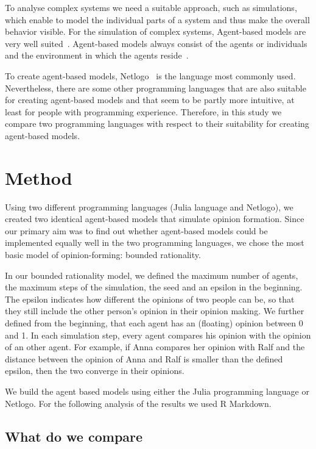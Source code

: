 \documentclass[runningheads]{llncs}
\begin{document}
To analyse complex systems we need a suitable approach, such as
simulations, which enable to model the individual parts of a system and
thus make the overall behavior visible. For the simulation of complex
systems, Agent-based models are very well suited~\autocite{Epstein2007}.
Agent-based models always consist of the agents or individuals and the
environment in which the agents
reside~\autocite{Bonabeau2002Agentbased}.

To create agent-based models, Netlogo~\autocite{Wilensky1999} is the
language most commonly used. Nevertheless, there are some other
programming languages that are also suitable for creating agent-based
models and that seem to be partly more intuitive, at least for people
with programming experience. Therefore, in this study we compare two
programming languages with respect to their suitability for creating
agent-based models.

\hypertarget{method}{%
\section{Method}\label{method}}

Using two different programming languages (Julia language and Netlogo),
we created two identical agent-based models that simulate opinion
formation. Since our primary aim was to find out whether agent-based
models could be implemented equally well in the two programming
languages, we chose the most basic model of opinion-forming: bounded
rationality.

In our bounded rationality model, we defined the maximum number of
agents, the maximum steps of the simulation, the seed and an epsilon in
the beginning. The epsilon indicates how different the opinions of two
people can be, so that they still include the other person's opinion in
their opinion making. We further defined from the beginning, that each
agent has an (floating) opinion between 0 and 1. In each simulation
step, every agent compares his opinion with the opinion of an other
agent. For example, if Anna compares her opinion with Ralf and the
distance between the opinion of Anna and Ralf is smaller than the
defined epsilon, then the two converge in their opinions.

We build the agent based models using either the Julia programming
language or Netlogo. For the following analysis of the results we used R
Markdown.

\hypertarget{what-do-we-compare}{%
\subsection{What do we compare}\label{what-do-we-compare}}
\end{document}
